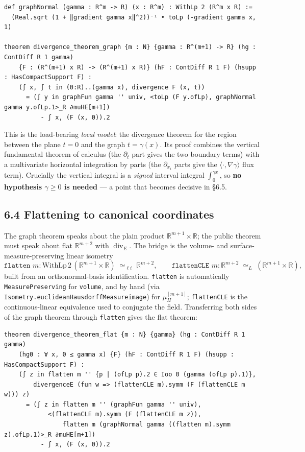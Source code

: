 ﻿\documentclass[12pt, a4paper]{article}
\renewcommand{\_}{\origunderscore\allowbreak}
\theoremstyle{definition}
\theoremstyle{plain}
\begin{document}
\begin{lstlisting}[caption={Graph normal and the graph Gauss--Green theorem}]
def graphNormal (gamma : R^m -> R) (x : R^m) : WithLp 2 (R^m x R) :=
  (Real.sqrt (1 + ‖gradient gamma x‖^2))⁻¹ • toLp (-gradient gamma x, 1)

theorem divergence_theorem_graph {m : N} {gamma : R^(m+1) -> R} (hg : ContDiff R 1 gamma)
    {F : (R^(m+1) x R) -> (R^(m+1) x R)} (hF : ContDiff R 1 F) (hsupp : HasCompactSupport F) :
    (∫ x, ∫ t in (0:R)..(gamma x), divergence F (x, t))
      = (∫ y in graphFun gamma '' univ, <toLp (F y.ofLp), graphNormal gamma y.ofLp.1>_R ∂muHE[m+1])
          - ∫ x, (F (x, 0)).2
\end{lstlisting}

This is the load-bearing \emph{local model}: the divergence theorem for the region between the plane
$t=0$ and the graph $t=\gamma(x)$.  Its proof combines the vertical fundamental theorem of calculus
(the $\partial_t$ part gives the two boundary terms) with a multivariate horizontal integration by
parts (the $\partial_{x_i}$ parts give the $\langle\cdot,\nabla\gamma\rangle$ flux term).  Crucially
the vertical integral is a \emph{signed} interval integral $\int_0^{\gamma x}$, so
\textbf{no hypothesis $\gamma\ge 0$ is needed} --- a point that becomes decisive in \S6.5.

\subsection{6.4 Flattening to canonical coordinates}

The graph theorem speaks about the plain product $\mathbb{R}^{m+1}\times\mathbb{R}$; the public
theorem must speak about flat $\mathbb{R}^{m+2}$ with $\operatorname{div}_E$.  The bridge is the
volume- and surface-measure-preserving linear isometry
\[
  \texttt{flatten } m : \mathrm{WithLp}\,2\,(\mathbb{R}^{m+1}\times\mathbb{R})\;\simeq_{\ell i}\;\mathbb{R}^{m+2},
  \qquad
  \texttt{flattenCLE } m : \mathbb{R}^{m+2}\;\simeq_{L}\;(\mathbb{R}^{m+1}\times\mathbb{R}),
\]
built from an orthonormal-basis identification.  \texttt{flatten} is automatically
\texttt{MeasurePreserving} for \texttt{volume}, and by hand (via
\texttt{Isometry.euclideanHausdorffMeasure\_image}) for $\mu_H^{[m+1]}$; \texttt{flattenCLE} is the
continuous-linear equivalence used to conjugate the field.  Transferring both sides of the graph
theorem through \texttt{flatten} gives the flat theorem:

\begin{lstlisting}[caption={Flat-coordinate divergence theorem}]
theorem divergence_theorem_flat {m : N} {gamma} (hg : ContDiff R 1 gamma)
    (hg0 : ∀ x, 0 ≤ gamma x) {F} (hF : ContDiff R 1 F) (hsupp : HasCompactSupport F) :
    (∫ z in flatten m '' {p | (ofLp p).2 ∈ Ioo 0 (gamma (ofLp p).1)},
        divergenceE (fun w => (flattenCLE m).symm (F (flattenCLE m w))) z)
      = (∫ z in flatten m '' (graphFun gamma '' univ),
            <(flattenCLE m).symm (F (flattenCLE m z)),
                flatten m (graphNormal gamma ((flatten m).symm z).ofLp.1)>_R ∂muHE[m+1])
          - ∫ x, (F (x, 0)).2
\end{lstlisting}
\end{document}

